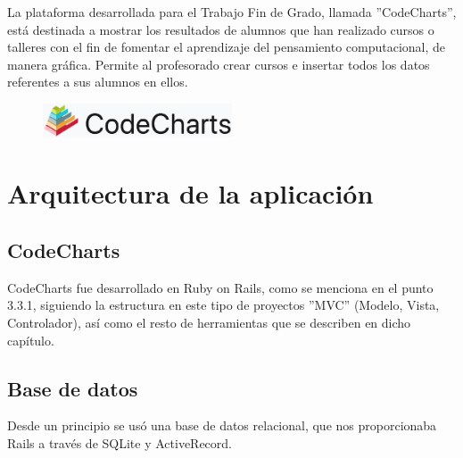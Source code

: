 
La plataforma desarrollada para el Trabajo Fin de Grado, llamada ''CodeCharts'', está destinada a mostrar los resultados de alumnos que han realizado cursos o talleres con el fin de fomentar el aprendizaje del pensamiento computacional, de manera gráfica.
Permite al profesorado crear cursos e insertar todos los datos referentes a sus alumnos en ellos.

\begin{figure}[!th]
\begin{center}
\includegraphics[width=0.5\textwidth]{images/logo_plataforma.eps}
\label{fig:9}
\end{center}
\end{figure}


\section{Arquitectura de la aplicación}
\label{4:sec:1}

\subsection{CodeCharts}
\label{1:sec:1}

CodeCharts fue desarrollado en Ruby on Rails, como se menciona en el punto 3.3.1, siguiendo la estructura en este tipo de proyectos ''MVC'' (Modelo, Vista, Controlador), así como el resto de herramientas que se describen en dicho capítulo.


\newpage
\subsection{Base de datos}
\label{1:sec:2}

Desde un principio se usó una base de datos relacional, que nos proporcionaba Rails a través de SQLite y ActiveRecord.

